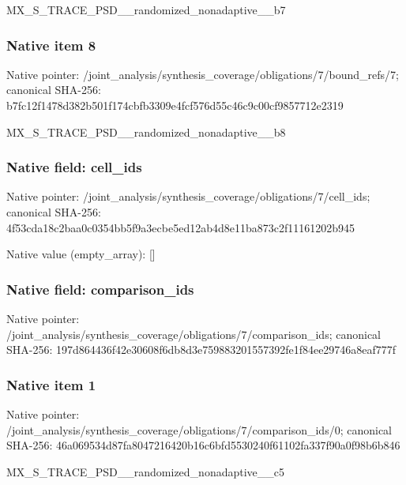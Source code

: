 \documentclass[10pt,a4paper]{article}
\begin{document}
\begingroup\raggedright\sloppy MX\_\allowbreak{}S\_\allowbreak{}TRACE\_\allowbreak{}PSD\_\allowbreak{}\_\allowbreak{}randomized\_\allowbreak{}nonadaptive\_\allowbreak{}\_\allowbreak{}b7\par\endgroup

\subsubsection{Native item 8}
Native pointer: /joint\_\allowbreak{}analysis/synthesis\_\allowbreak{}coverage/obligations/7/bound\_\allowbreak{}refs/7; canonical SHA-256: b7fc12f1478d382b501f174cbfb3309e4fcf576d55c46c9c00cf9857712e2319

\begingroup\raggedright\sloppy MX\_\allowbreak{}S\_\allowbreak{}TRACE\_\allowbreak{}PSD\_\allowbreak{}\_\allowbreak{}randomized\_\allowbreak{}nonadaptive\_\allowbreak{}\_\allowbreak{}b8\par\endgroup

\subsubsection{Native field: cell\_\allowbreak{}ids}
Native pointer: /joint\_\allowbreak{}analysis/synthesis\_\allowbreak{}coverage/obligations/7/cell\_\allowbreak{}ids; canonical SHA-256: 4f53cda18c2baa0c0354bb5f9a3ecbe5ed12ab4d8e11ba873c2f11161202b945

Native value (empty\_\allowbreak{}array): []

\subsubsection{Native field: comparison\_\allowbreak{}ids}
Native pointer: /joint\_\allowbreak{}analysis/synthesis\_\allowbreak{}coverage/obligations/7/comparison\_\allowbreak{}ids; canonical SHA-256: 197d864436f42e30608f6db8d3e759883201557392fe1f84ee29746a8eaf777f

\subsubsection{Native item 1}
Native pointer: /joint\_\allowbreak{}analysis/synthesis\_\allowbreak{}coverage/obligations/7/comparison\_\allowbreak{}ids/0; canonical SHA-256: 46a069534d87fa8047216420b16c6bfd5530240f61102fa337f90a0f98b6b846

\begingroup\raggedright\sloppy MX\_\allowbreak{}S\_\allowbreak{}TRACE\_\allowbreak{}PSD\_\allowbreak{}\_\allowbreak{}randomized\_\allowbreak{}nonadaptive\_\allowbreak{}\_\allowbreak{}c5\par\endgroup
\end{document}
